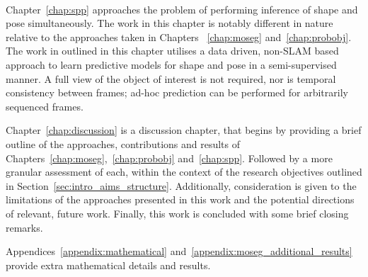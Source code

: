 ~

Chapter~\ref{chap:spp} approaches the problem of performing inference of shape and pose simultaneously. 
The work in this chapter is notably different in nature relative to the approaches taken in Chapters
~\ref{chap:moseg} and~\ref{chap:probobj}. The work in outlined in this chapter utilises a data driven, 
non-SLAM based approach to learn predictive models for shape and pose in a semi-supervised manner. A full 
view of the object of interest is not required, nor is temporal consistency between frames; ad-hoc prediction 
can be performed for arbitrarily sequenced frames.

Chapter~\ref{chap:discussion} is a discussion chapter, that begins by providing a brief outline of the approaches, 
contributions and results of Chapters~\ref{chap:moseg},~\ref{chap:probobj} and~\ref{chap:spp}. Followed by a more 
granular assessment of each, within the context of the research objectives outlined in Section~\ref{sec:intro_aims_structure}. 
Additionally, consideration is given to the limitations of the approaches presented in this work and the potential 
directions of relevant, future work. Finally, this work is concluded with some brief closing remarks.

Appendices~\ref{appendix:mathematical} and~\ref{appendix:moseg_additional_results} provide extra mathematical 
details and results.
